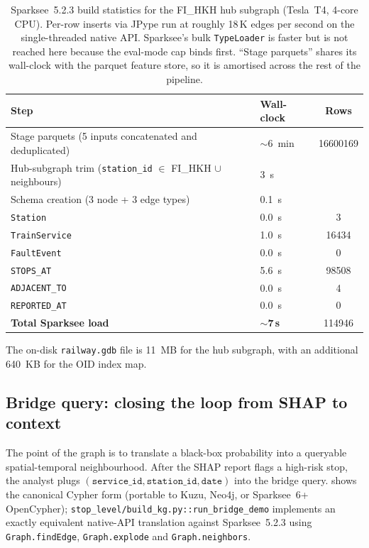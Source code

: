 \begin{table}[H]
    \centering
    \caption{Sparksee~5.2.3 build statistics for the FI\_HKH hub subgraph (Tesla~T4, 4-core CPU). Per-row inserts via JPype run at roughly 18\,K edges per second on the single-threaded native API. Sparksee's bulk \texttt{TypeLoader} is faster but is not reached here because the eval-mode cap binds first. ``Stage parquets'' shares its wall-clock with the parquet feature store, so it is amortised across the rest of the pipeline.}
    \label{tab:kg-build}
    \small
    \begin{tabular}{l l S[table-format=8.0,group-separator={,}]}
        \toprule
        Step & Wall-clock & {Rows} \\
        \midrule
        Stage parquets (5 inputs concatenated and deduplicated) & $\sim$\SI{6}{min} & 16600169 \\
        Hub-subgraph trim (\texttt{station\_id} $\in$ FI\_HKH $\cup$ neighbours) & \SI{3}{s} &  \\
        Schema creation (3 node + 3 edge types)        & \SI{0.1}{s} &  \\
        \texttt{Station}            & \SI{0.0}{s} & 3 \\
        \texttt{TrainService}       & \SI{1.0}{s} & 16434 \\
        \texttt{FaultEvent}         & \SI{0.0}{s} & 0 \\
        \texttt{STOPS\_AT}          & \SI{5.6}{s} & 98508 \\
        \texttt{ADJACENT\_TO}       & \SI{0.0}{s} & 4 \\
        \texttt{REPORTED\_AT}       & \SI{0.0}{s} & 0 \\
        \midrule
        \textbf{Total Sparksee load} & $\sim$\textbf{7\,s} & 114946 \\
        \bottomrule
    \end{tabular}
\end{table}

The on-disk \texttt{railway.gdb} file is \SI{11}{MB} for the hub subgraph, with an additional \SI{640}{KB} for the OID index map.

\subsection{Bridge query: closing the loop from SHAP to context}

The point of the graph is to translate a black-box probability into a queryable spatial-temporal neighbourhood. After the SHAP report flags a high-risk stop, the analyst plugs $(\texttt{service\_id}, \texttt{station\_id}, \texttt{date})$ into the bridge query.  shows the canonical Cypher form (portable to Kuzu, Neo4j, or Sparksee~6+ OpenCypher); \texttt{stop\_level/build\_kg.py::run\_bridge\_demo} implements an exactly equivalent native-API translation against Sparksee~5.2.3 using \texttt{Graph.findEdge}, \texttt{Graph.explode} and \texttt{Graph.neighbors}.


